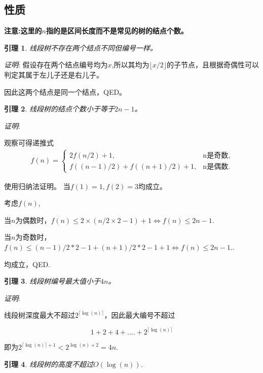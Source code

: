 \documentclass{article}
\newtheorem{lemma}{引理}
\begin{document}
\subsection{性质}
\textbf{注意:这里的$n$指的是区间长度而不是常见的树的结点个数。}

\begin{lemma}
    线段树不存在两个结点不同但编号一样。
\end{lemma}
\emph{证明}:
假设存在两个结点编号均为$x$,所以其均为$\lfloor x/2 \rfloor $的子节点，且根据奇偶性可以判定其属于左儿子还是右儿子。

因此这两个结点是同一个结点，QED。


\begin{lemma}
    线段树的结点个数小于等于$2n-1$。
    \label{lemma-2}
\end{lemma}

\emph{证明}:

观察可得递推式
\begin{align*}
    f(n) = \begin{cases}
        2f(n/2) + 1, & \text{n是奇数,} \\
        f((n-1)/2) + f((n+1)/2) + 1, & \text{n是偶数.} 
    \end{cases}
\end{align*}

使用归纳法证明。
当$f(1) = 1, f(2) = 3$均成立。

考虑$f(n)$, 

当$n$为偶数时，$f(n) \leq 2\times(n/2\times2-1) + 1 \Leftrightarrow f(n) \leq 2n-1.$

当$n$为奇数时，$f(n) \leq (n-1)/2*2 - 1 + (n+1)/2*2 - 1 + 1 \Leftrightarrow f(n)\leq 2n-1.$.

均成立，QED.



\begin{lemma}
    线段树编号最大值小于$4n$。
\end{lemma}

\emph{证明}:

线段树深度最大不超过$2^{\lceil \log(n) \rceil}$，因此最大编号不超过

\begin{equation*}
    1 + 2 + 4 + .... + 2^{\lceil \log(n) \rceil}
\end{equation*}

即为$2^{\lceil \log(n) \rceil+1} < 2^{\log(n)+2} = 4n$.


\begin{lemma}
    线段树的高度不超过$O(\log(n))$.
\end{lemma}
\end{document}
